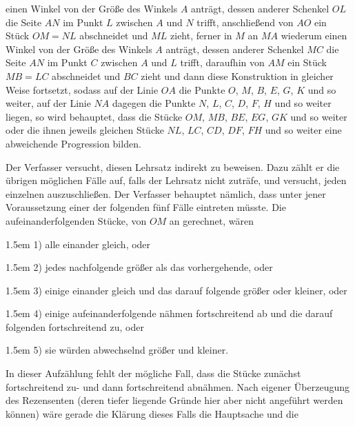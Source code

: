 \par\noindent
\begin{minipage}[t]{.38\textwidth}
\vspace{0pt}
\centering

\end{minipage}\hfill
\begin{minipage}[t]{.58\textwidth}
\vspace{0pt}
einen Winkel von der Größe des Winkels $A$ anträgt, dessen anderer Schenkel $OL$ die Seite $AN$ im
Punkt $L$ zwischen $A$ und $N$ trifft, anschließend von $AO$ ein Stück $OM=NL$ abschneidet und
$ML$ zieht, ferner in $M$ an $MA$ wiederum einen Winkel von der Größe des Winkels
$A$ anträgt, dessen anderer Schenkel $MC$ die Seite $AN$ im Punkt $C$ zwischen $A$ und $L$
trifft, daraufhin von $AM$ ein Stück $MB=LC$ abschneidet und $BC$ zieht und dann diese
Konstruktion in gleicher Weise fortsetzt, sodass auf der Linie $OA$ die Punkte $O$, $M$,
$B$, $E$, $G$, $K$ und so weiter, auf der Linie $NA$ dagegen die Punkte $N$, $L$, $C$, $D$,
$F$, $H$ und so weiter liegen, so wird behauptet, dass die Stücke $OM$, $MB$, $BE$, $EG$, $GK$
und so weiter oder die ihnen jeweils gleichen Stücke $NL$, $LC$, $CD$, $DF$, $FH$ und so weiter eine
abweichende Progression bilden.
\end{minipage}

\medskip
Der Verfasser versucht, diesen Lehrsatz indirekt zu beweisen. Dazu zählt er die übrigen
möglichen Fälle auf, falls der Lehrsatz nicht zuträfe, und versucht, jeden
einzelnen auszuschließen. Der Verfasser behauptet nämlich, dass unter jener Voraussetzung einer
der folgenden fünf Fälle eintreten müsste. Die aufeinanderfolgenden Stücke, von $OM$ an
gerechnet, wären


\par\hangindent1.5em 1) alle einander gleich, oder
\par\hangindent1.5em 2) jedes nachfolgende größer als das vorhergehende, oder
\par\hangindent1.5em 3) einige einander gleich und das darauf folgende größer oder kleiner, oder
\par\hangindent1.5em 4) einige aufeinanderfolgende nähmen fortschreitend ab und die darauf folgenden
fortschreitend zu, oder
\par\hangindent1.5em 5) sie würden abwechselnd größer und kleiner.


In dieser Aufzählung fehlt der mögliche Fall, dass die Stücke zunächst fortschreitend
zu- und dann fortschreitend abnähmen. Nach eigener Überzeugung des Rezensenten (deren tiefer liegende
Gründe hier aber nicht angeführt werden können) wäre gerade die Klärung dieses Falls die Hauptsache
und die\space%
